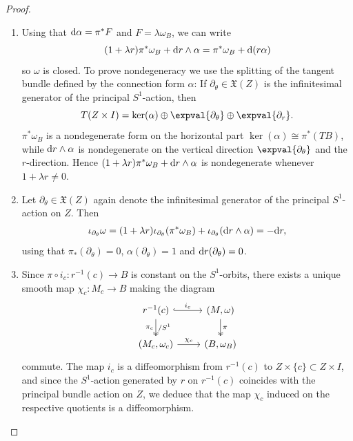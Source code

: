 \documentclass[10pt,oneside,reqno]{amsart}
\theoremstyle{definition}
\renewcommand{\dd}{\textup{d}}
\begin{document}
\begin{proof}
    \begin{enumerate}
        \item Using that $\dd \alpha =\pi^* F$ and $F=\lambda \omega_B$, we can write
        \begin{equation*}
            (1+\lambda r)\pi^*\omega_B + \dd r\wedge \alpha= \pi^*\omega_B + \dd (r \alpha)
        \end{equation*}
        so $\omega$ is closed. To prove nondegeneracy we use the splitting of the tangent bundle defined by the connection form $\alpha$: If $\partial_\theta\in \mathfrak{X}(Z)$ is the infinitesimal generator of the principal $S^1$-action, then 
        \begin{equation*}
            T(Z\times I) = \ker(\alpha) \oplus \expval{\partial_\theta} \oplus \expval{\partial_r}.
        \end{equation*}
        $\pi^*\omega_B$ is a nondegenerate form on the horizontal part $\ker(\alpha)\cong\pi^*(TB)$, while $\dd r\wedge \alpha$ is nondegenerate on the vertical direction $\expval{\partial_\theta}$ and the $r$-direction. Hence $(1+\lambda r)\pi^*\omega_B +\dd r\wedge \alpha$ is nondegenerate whenever $1+\lambda r\neq 0$.
        \item Let $\partial_\theta\in \mathfrak{X}(Z)$ again denote the infinitesimal generator of the principal $S^1$-action on $Z$. Then
        \begin{align*}
            \iota_{\partial_\theta} \omega = (1+\lambda r)\iota_{\partial_\theta}(\pi^*\omega_B) + \iota_{\partial_\theta}(\dd r\wedge \alpha) =-\dd r,
        \end{align*}
        using that $\pi_*(\partial_\theta) = 0$, $\alpha(\partial_\theta)=1$ and $\dd r(\partial_\theta)=0$. 
        \item Since $\pi\circ i_c:r^{-1}(c)\to B$ is constant on the $S^1$-orbits, there exists a unique smooth map $\chi_c:M_c\to B$ making the diagram
    \begin{equation*}
        \begin{tikzcd}
            r^{-1}(c) \arrow[r, "i_c", hook] \arrow[d, "/S^1","\pi_c"', two heads] & {(M,\omega)} \arrow[d, "\pi", two heads] \\
            {(M_c,\omega_c)} \arrow[r, "\chi_c"]                              & {(B,\omega_B)}                               
        \end{tikzcd}
    \end{equation*}
    commute. The map $i_c$ is a diffeomorphism from $r^{-1}(c)$ to $Z \times \{c\} \subset Z \times I$, and since the $S^1$-action generated by $r$ on $r^{-1}(c)$ coincides with the principal bundle action on $Z$, we deduce that the map $\chi_c$ induced on the respective quotients is a diffeomorphism. 


\end{enumerate}
\end{proof}
\end{document}

